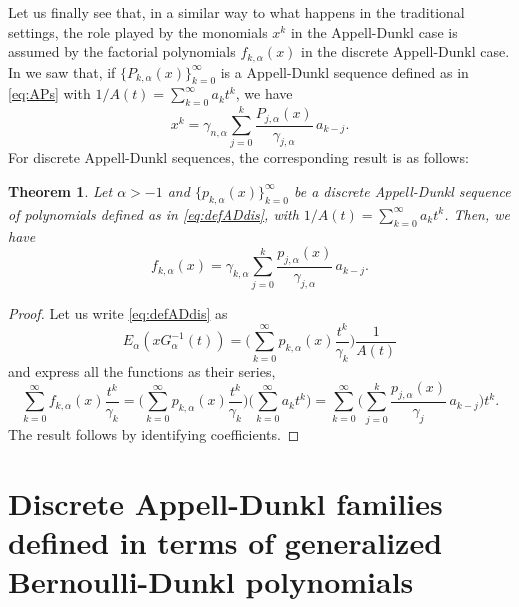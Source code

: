 \documentclass[11pt]{article}
\theoremstyle{plain}
\newtheorem{theorem}{Theorem}[section]
\theoremstyle{remark}
\numberwithin{equation}{section} %
\newcommand{\Ea}{E_{\alpha}}
\newcommand{\cc}{\gamma}
\begin{document}
Let us finally see that, in a similar way to what happens in the traditional settings, the role played by the monomials $x^k$ in the Appell-Dunkl case is assumed by the factorial polynomials $f_{k,\alpha}(x)$ in the discrete Appell-Dunkl case. In \cite{CDPV, CMV} we saw that, if $\{P_{k,\alpha}(x)\}_{k=0}^{\infty}$ is a Appell-Dunkl sequence defined as in \eqref{eq:APs} with $1/A(t) = \sum_{k=0}^\infty a_k t^k$, we have
\[
  x^k = \cc_{n,\alpha} \sum_{j=0}^k \frac{P_{j,\alpha}(x)}{\cc_{j,\alpha}}\, a_{k-j}.
\]
For discrete Appell-Dunkl sequences, the corresponding result is as follows:


\begin{theorem}
\label{teo:fnfrompj}
Let $\alpha>-1$ and $\{p_{k,\alpha}(x)\}_{k=0}^{\infty}$ be a discrete Appell-Dunkl sequence of polynomials 
defined as in \eqref{eq:defADdis}, with $1/A(t) = \sum_{k=0}^\infty a_k t^k$. Then, we have
\begin{equation*}
  f_{k,\alpha}(x) = \cc_{k,\alpha} \sum_{j=0}^k \frac{p_{j,\alpha}(x)}{\cc_{j,\alpha}}\, a_{k-j}.
\end{equation*}
\end{theorem}

\begin{proof}
Let us write \eqref{eq:defADdis} as
\[
\Ea(xG_{\alpha}^{-1}(t)) 
= \bigg( \sum_{k=0}^{\infty} p_{k,\alpha}(x) \frac{t^k}{\cc_k} \bigg) \frac{1}{A(t)}
\]
and express all the functions as their series,
\[
\sum_{k=0}^{\infty} f_{k,\alpha}(x) \frac{t^k}{\cc_k}
= \bigg( \sum_{k=0}^{\infty} p_{k,\alpha}(x) \frac{t^k}{\cc_k} \bigg)
\bigg( \sum_{k=0}^{\infty} a_k t^k \bigg)
= \sum_{k=0}^{\infty} \bigg( \sum_{j=0}^k \frac{p_{j,\alpha}(x)}{\cc_{j}}\, a_{k-j} \bigg) t^k.
\]
The result follows by identifying coefficients.
\end{proof}

\section{Discrete Appell-Dunkl families defined in terms 
of generalized Bernoulli-Dunkl polynomials}
\label{sec:another}
\end{document}
